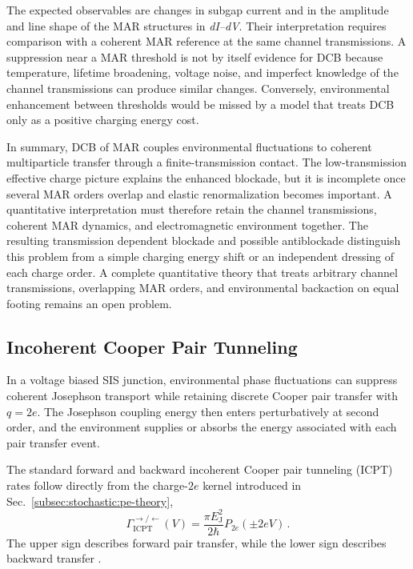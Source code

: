             The expected observables are changes in subgap current and in the amplitude and line shape of the MAR structures in \textit{dI--dV}. Their interpretation requires comparison with a coherent MAR reference at the same channel transmissions. A suppression near a MAR threshold is not by itself evidence for DCB because temperature, lifetime broadening, voltage noise, and imperfect knowledge of the channel transmissions can produce similar changes. Conversely, environmental enhancement between thresholds would be missed by a model that treats DCB only as a positive charging energy cost.

            In summary, DCB of MAR couples environmental fluctuations to coherent multiparticle transfer through a finite-transmission contact. The low-transmission effective charge picture explains the enhanced blockade, but it is incomplete once several MAR orders overlap and elastic renormalization becomes important. A quantitative interpretation must therefore retain the channel transmissions, coherent MAR dynamics, and electromagnetic environment together. The resulting transmission dependent blockade and possible antiblockade distinguish this problem from a simple charging energy shift or an independent dressing of each charge order. A complete quantitative theory that treats arbitrary channel transmissions, overlapping MAR orders, and environmental backaction on equal footing remains an open problem.

    \subsection{Incoherent Cooper Pair Tunneling}
    \label{subsec:stochastic:icpt}

        In a voltage biased SIS junction, environmental phase fluctuations can suppress coherent Josephson transport while retaining discrete Cooper pair transfer with $q=2e$. The Josephson coupling energy then enters perturbatively at second order, and the environment supplies or absorbs the energy associated with each pair transfer event.

        The standard forward and backward incoherent Cooper pair tunneling (ICPT) rates follow directly from the charge-$2e$ kernel introduced in Sec.~\ref{subsec:stochastic:pe-theory},
        \begin{equation}
            \Gamma_\mathrm{ICPT}^{\rightarrow/\leftarrow}(V) = \frac{\pi E_\mathrm{J}^{2}}{2\hbar}P_{2e}(\pm 2eV)\,.
        \end{equation}
        The upper sign describes forward pair transfer, while the lower sign describes backward transfer \cite{falci_quasiparticle_1991,ingold_charge_1992}.

